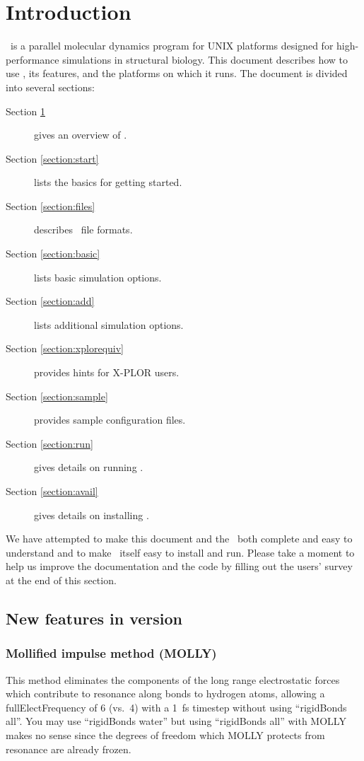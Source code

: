 \section{Introduction}
\label{section:intro}

\NAMD\ is a parallel molecular dynamics program for UNIX 
platforms designed for high-performance 
simulations in structural biology.  This document describes how to use 
\NAMD, its features, and the platforms on which it runs.
The document is divided into several sections:
\begin{description}
\item[Section \ref{section:intro}] gives an overview of \NAMD.
\item[Section \ref{section:start}] lists the basics for getting started.
\item[Section \ref{section:files}] describes \NAMD\ file formats.
\item[Section \ref{section:basic}] lists basic simulation options.
\item[Section \ref{section:add}] lists additional simulation options.
\item[Section \ref{section:xplorequiv}] provides hints for X-PLOR users.
\item[Section \ref{section:sample}] provides sample configuration files.
\item[Section \ref{section:run}] gives details on running \NAMD.
\item[Section \ref{section:avail}] gives details on installing \NAMD.
\end{description}

We have attempted to make this document and the \PG\ both
complete and easy to understand and to make \NAMD\ itself
easy to install and run.  Please take a moment to help us improve
the documentation and the code by filling out the users' survey
at the end of this section.

\subsection{New features in version \NAMDVER}

\subsubsection*{Mollified impulse method (MOLLY)}

This method eliminates the components of the long range electrostatic
forces which contribute to resonance along bonds to hydrogen atoms,
allowing a fullElectFrequency of 6 (vs.\ 4) with a 1~fs timestep
without using ``rigidBonds all''.  You may use ``rigidBonds water'' but
using ``rigidBonds all'' with MOLLY makes no sense since the degrees of
freedom which MOLLY protects from resonance are already frozen.

